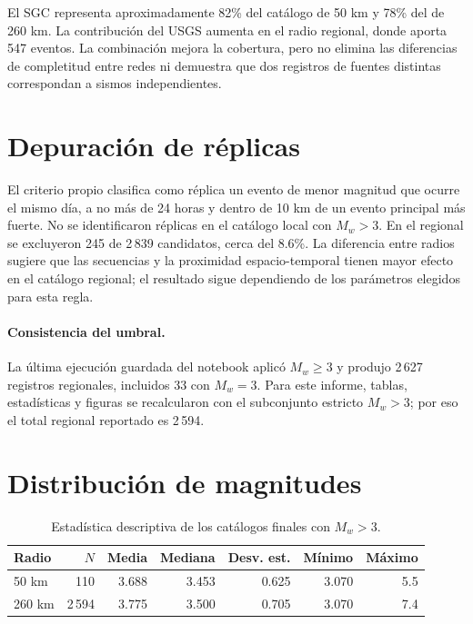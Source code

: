 \documentclass[12pt]{article}
\begin{document}
El SGC representa aproximadamente 82\% del catálogo de 50 km y 78\% del de
260 km. La contribución del USGS aumenta en el radio regional, donde aporta
547 eventos. La combinación mejora la cobertura, pero no elimina las
 diferencias de completitud entre redes ni demuestra que dos registros de
fuentes distintas correspondan a sismos independientes.

\section{Depuración de réplicas}

El criterio propio clasifica como réplica un evento de menor magnitud que
ocurre el mismo día, a no más de 24 horas y dentro de 10 km de un evento
principal más fuerte. No se identificaron réplicas en el catálogo local con
$M_w>3$. En el regional se excluyeron 245 de 2\,839 candidatos, cerca del
8.6\%. La diferencia entre radios sugiere que las secuencias y la proximidad
espacio-temporal tienen mayor efecto en el catálogo regional; el resultado
sigue dependiendo de los parámetros elegidos para esta regla.

\paragraph{Consistencia del umbral.}
La última ejecución guardada del notebook aplicó $M_w\geq3$ y produjo 2\,627
registros regionales, incluidos 33 con $M_w=3$. Para este informe, tablas,
estadísticas y figuras se recalcularon con el subconjunto estricto $M_w>3$;
por eso el total regional reportado es 2\,594.

\section{Distribución de magnitudes}

\begin{table}[H]
\centering
\caption{Estadística descriptiva de los catálogos finales con $M_w>3$.}
\label{tab:estadistica}
\begin{tabular}{lrrrrrr}
\toprule
Radio & $N$ & Media & Mediana & Desv. est. & Mínimo & Máximo \\
\midrule
50 km  & 110   & 3.688 & 3.453 & 0.625 & 3.070 & 5.5 \\
260 km & 2\,594 & 3.775 & 3.500 & 0.705 & 3.070 & 7.4 \\
\bottomrule
\end{tabular}
\end{table}
\end{document}
